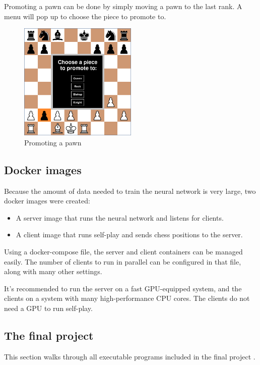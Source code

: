 \documentclass{article}
\begin{document}
Promoting a pawn can be done by simply moving a pawn to the last rank. A menu will pop up 
to choose the piece to promote to.

\begin{figure}[H]
    \centering
    \includegraphics[width=0.5\textwidth]{img/chessboard-promotion.png}
    \caption{Promoting a pawn}
\end{figure}

\subsection{Docker images}

Because the amount of data needed to train the neural network is very large, two docker images were created:

\begin{itemize}
    \item A server image that runs the neural network and listens for clients.
    \item A client image that runs self-play and sends chess positions to the server.
\end{itemize}

Using a docker-compose file, the server and client containers can be managed easily. The number of clients 
to run in parallel can be configured in that file, along with many other settings.

It's recommended to run the server on a fast GPU-equipped system, and the clients on a system with many high-performance CPU cores.
The clients do not need a GPU to run self-play.

\subsection{The final project}

This section walks through all executable programs included in the final project \cite{zjefferChessEngineDeep2022}.
\end{document}
